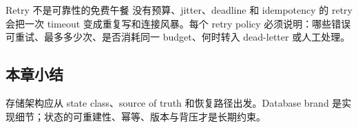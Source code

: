 \begin{warningbox}{Retry 不是可靠性的免费午餐}
没有预算、jitter、deadline 和 idempotency 的 retry 会把一次 timeout 变成重复写和连接风暴。每个 retry policy 必须说明：哪些错误可重试、最多多少次、是否消耗同一 budget、何时转入 dead-letter 或人工处理。
\end{warningbox}

\subsection{本章小结}

存储架构应从 state class、source of truth 和恢复路径出发。Database brand 是实现细节；状态的可重建性、幂等、版本与背压才是长期约束。

